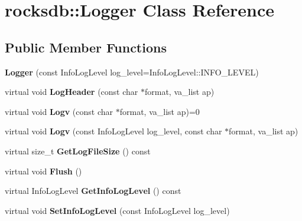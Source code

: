 \hypertarget{classrocksdb_1_1Logger}{}\section{rocksdb\+:\+:Logger Class Reference}
\label{classrocksdb_1_1Logger}
\subsection*{Public Member Functions}
\begin{DoxyCompactItemize}
\item 
{\bfseries Logger} (const Info\+Log\+Level log\+\_\+level=Info\+Log\+Level\+::\+I\+N\+F\+O\+\_\+\+L\+E\+V\+EL)\hypertarget{classrocksdb_1_1Logger_a55e2163280415b50fd691030e6d67f85}{}\label{classrocksdb_1_1Logger_a55e2163280415b50fd691030e6d67f85}

\item 
virtual void {\bfseries Log\+Header} (const char $\ast$format, va\+\_\+list ap)\hypertarget{classrocksdb_1_1Logger_a410df0fed9121f3ea0797d1cfd45c6a5}{}\label{classrocksdb_1_1Logger_a410df0fed9121f3ea0797d1cfd45c6a5}

\item 
virtual void {\bfseries Logv} (const char $\ast$format, va\+\_\+list ap)=0\hypertarget{classrocksdb_1_1Logger_ab122e681ff3273a431853d8abe0adb8b}{}\label{classrocksdb_1_1Logger_ab122e681ff3273a431853d8abe0adb8b}

\item 
virtual void {\bfseries Logv} (const Info\+Log\+Level log\+\_\+level, const char $\ast$format, va\+\_\+list ap)\hypertarget{classrocksdb_1_1Logger_a97320233345b7f1513bbb560b79e906d}{}\label{classrocksdb_1_1Logger_a97320233345b7f1513bbb560b79e906d}

\item 
virtual size\+\_\+t {\bfseries Get\+Log\+File\+Size} () const\hypertarget{classrocksdb_1_1Logger_a61fd491a0af47177b1a7baa4547cfbe4}{}\label{classrocksdb_1_1Logger_a61fd491a0af47177b1a7baa4547cfbe4}

\item 
virtual void {\bfseries Flush} ()\hypertarget{classrocksdb_1_1Logger_aac0bfb0a497280b230bd4acab71fd3ed}{}\label{classrocksdb_1_1Logger_aac0bfb0a497280b230bd4acab71fd3ed}

\item 
virtual Info\+Log\+Level {\bfseries Get\+Info\+Log\+Level} () const\hypertarget{classrocksdb_1_1Logger_a2e87a92355786a15f155ece899acc74d}{}\label{classrocksdb_1_1Logger_a2e87a92355786a15f155ece899acc74d}

\item 
virtual void {\bfseries Set\+Info\+Log\+Level} (const Info\+Log\+Level log\+\_\+level)\hypertarget{classrocksdb_1_1Logger_ad501902d1fc1bcb12593b50e1b38ef85}{}\label{classrocksdb_1_1Logger_ad501902d1fc1bcb12593b50e1b38ef85}

\end{DoxyCompactItemize}
